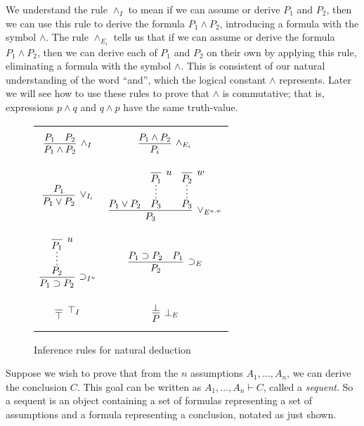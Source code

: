 \documentclass[conference]{IEEEtran}
\begin{document}
We understand the rule $\wedge_I$ to mean if we can assume or derive $P_1$ and $P_2$, then we can use this rule to derive the formula $P_1 \wedge P_2$, introducing a formula with the symbol $\wedge$. The rule $\wedge_{E_i}$ tells us that if we can assume or derive the formula $P_1 \wedge P_2$, then we can derive each of $P_1$ and $P_2$ on their own by applying this rule, eliminating a formula with the symbol $\wedge$. This is consistent of our natural understanding of the word ``and'', which the logical constant $\wedge$ represents. Later we will see how to use these rules to prove that $\wedge$ is commutative; that is, expressions $p \wedge q$ and $q \wedge p$ have the same truth-value.

\begin{figure}

\begin{center}
\begin{tabu} to 0.5\textwidth { X[c,b] X[c,b] }

$$
\infer[\wedge_I]{P_1 \wedge P_2}{P_1 & P_2}
$$

&

$$
\infer[\wedge_{E_i}]{P_i}{P_1 \wedge P_2}
$$

\\

$$
\infer[\vee_{I_i}]{P_1 \vee P_2}{P_1}
$$

&

$$
\infer[\vee_{E^{u,w}}]{P_3}{P_1 \vee P_2 &
    \infer*{P_3}{\infer[u]{P_1}{}} &
    \infer*{P_3}{\infer[w]{P_2}{}}}
$$

\\

$$
\infer[\supset_{I^u}]{P_1 \supset P_2}{\infer*{P_2}{\infer[u]{P_1}{}}}
$$

&

$$
\infer[\supset_E]{P_2}{P_1 \supset P_2 & P_1}
$$

\\[-20pt]

$$
\infer[\top_I]{\top}{}
$$

&

$$
\infer[\bot_E]{P}{\bot}
$$

\end{tabu}
\end{center}

\caption{Inference rules for natural deduction}
\label{fig:natdedrules}
\end{figure}


Suppose we wish to prove that from the $n$ assumptions $A_1, \dots , A_n$, we can derive the conclusion $C$. This goal can be written as $A_1, \dots, A_n \vdash C$, called a \textit{sequent}. So a sequent is an object containing a set of formulas representing a set of assumptions and a formula representing a conclusion, notated as just shown.
\end{document}
